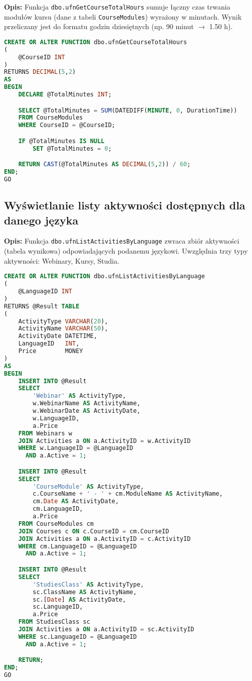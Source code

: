 \documentclass[12pt]{article}
\begin{document}
\textbf{Opis:} Funkcja \texttt{dbo.ufnGetCourseTotalHours} sumuje łączny czas trwania modułów kursu (dane z tabeli \texttt{CourseModules}) wyrażony w minutach. Wynik przeliczany jest do formatu godzin dziesiętnych (np. 90 minut $\rightarrow$ 1.50 h).

 
\begin{lstlisting}[language=SQL]
CREATE OR ALTER FUNCTION dbo.ufnGetCourseTotalHours
(
    @CourseID INT
)
RETURNS DECIMAL(5,2)
AS
BEGIN
    DECLARE @TotalMinutes INT;

    SELECT @TotalMinutes = SUM(DATEDIFF(MINUTE, 0, DurationTime))
    FROM CourseModules
    WHERE CourseID = @CourseID;

    IF @TotalMinutes IS NULL
        SET @TotalMinutes = 0;

    RETURN CAST(@TotalMinutes AS DECIMAL(5,2)) / 60;
END;
GO
\end{lstlisting}
\newpage
\subsection{Wyświetlanie listy aktywności dostępnych dla danego języka}
\label{sec:activities_by_language}

\textbf{Opis:} Funkcja \texttt{dbo.ufnListActivitiesByLanguage} zwraca zbiór aktywności (tabela wynikowa) odpowiadających podanemu językowi. Uwzględnia trzy typy aktywności: Webinary, Kursy, Studia.


 
\begin{lstlisting}[language=SQL]
CREATE OR ALTER FUNCTION dbo.ufnListActivitiesByLanguage
(
    @LanguageID INT
)
RETURNS @Result TABLE
(
    ActivityType VARCHAR(20),
    ActivityName VARCHAR(50),
    ActivityDate DATETIME,
    LanguageID   INT,
    Price        MONEY
)
AS
BEGIN
    INSERT INTO @Result
    SELECT 
        'Webinar' AS ActivityType,
        w.WebinarName AS ActivityName,
        w.WebinarDate AS ActivityDate,
        w.LanguageID,
        a.Price
    FROM Webinars w
    JOIN Activities a ON a.ActivityID = w.ActivityID
    WHERE w.LanguageID = @LanguageID
      AND a.Active = 1;

    INSERT INTO @Result
    SELECT 
        'CourseModule' AS ActivityType,
        c.CourseName + ' - ' + cm.ModuleName AS ActivityName,
        cm.Date AS ActivityDate,
        cm.LanguageID,
        a.Price
    FROM CourseModules cm
    JOIN Courses c ON c.CourseID = cm.CourseID
    JOIN Activities a ON a.ActivityID = c.ActivityID
    WHERE cm.LanguageID = @LanguageID
      AND a.Active = 1;

    INSERT INTO @Result
    SELECT 
        'StudiesClass' AS ActivityType,
        sc.ClassName AS ActivityName,
        sc.[Date] AS ActivityDate,
        sc.LanguageID,
        a.Price
    FROM StudiesClass sc
    JOIN Activities a ON a.ActivityID = sc.ActivityID
    WHERE sc.LanguageID = @LanguageID
      AND a.Active = 1;

    RETURN;
END;
GO
\end{lstlisting}
\end{document}
